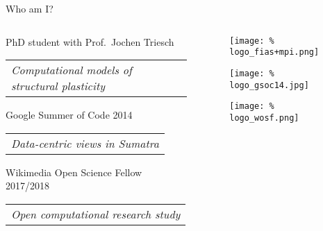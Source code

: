 
\begin{frame}{Who am I?}
  \begin{columns}
    \begin{column}{.625\textwidth}
      \minipage[c][0.65\textheight][s]{\columnwidth}

      PhD student with Prof.~Jochen Triesch
      \vspace{0.15cm}
      
\begin{tabular}{|p{}}
      \textit{Computational models of structural plasticity}
\end{tabular}	     
  

      \vfill

      Google Summer of Code 2014
      \vspace{0.15cm}

      \begin{tabular}{|p{}}
        \textit{Data-centric views in Sumatra}
      \end{tabular}	     

      \vfill

      Wikimedia Open Science Fellow 2017/2018
      \vspace{0.15cm}

      \begin{tabular}{|p{}}
        \textit{Open computational research study}
      \end{tabular}	     

      
      
      \endminipage      
    \end{column}
    \begin{column}{.249\textwidth}
      \minipage[c][0.7\textheight][s]{\columnwidth}

      \begin{figure}
        \centering
        \texttt{[image: \%
          logo\_fias+mpi.png]} %
      \end{figure}
      
      \begin{figure}
        \centering
        \texttt{[image: \%
          logo\_gsoc14.jpg]} %
      \end{figure}

      \begin{figure}
        \centering
        \texttt{[image: \%
          logo\_wosf.png]} %
      \end{figure}
      \endminipage      

      
      
    \end{column}
  \end{columns}
\end{frame}

